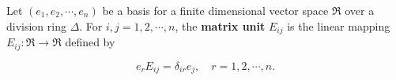 Let $(e_1, e_2, \cdots, e_n)$ be a basis for a finite dimensional vector space $\mathfrak{R}$ over a division ring $\Delta$. For $i, j = 1, 2, \cdots, n$, the \textbf{matrix unit} $E_{ij}$ is the linear mapping $E_{ij}: \mathfrak{R} \to \mathfrak{R}$ defined by

$$e_r E_{ij} = \delta_{ir} e_j, \quad r = 1, 2, \cdots, n.$$
